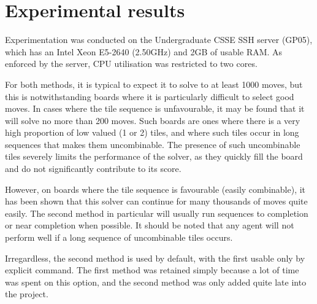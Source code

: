 \documentclass[a4paper, 11pt, titlepage]{report}
\begin{document}
\section{Experimental results}
Experimentation was conducted on the Undergraduate CSSE SSH server (GP05), which has an Intel Xeon E5-2640 (2.50GHz) and 2GB of usable RAM. As enforced by the server, CPU utilisation was restricted to two cores.

For both methods, it is typical to expect it to solve to at least 1000 moves, but this is notwithstanding boards where it is particularly difficult to select good moves. In cases where the tile sequence is unfavourable, it may be found that it will solve no more than 200 moves. Such boards are ones where there is a very high proportion of low valued (1 or 2) tiles, and where such tiles occur in long sequences that makes them uncombinable. The presence of such uncombinable tiles severely limits the performance of the solver, as they quickly fill the board and do not significantly contribute to its score.

However, on boards where the tile sequence is favourable (easily combinable), it has been shown that this solver can continue for many thousands of moves quite easily. The second method in particular will usually run sequences to completion or near completion when possible. It should be noted that any agent will not perform well if a long sequence of uncombinable tiles occurs. 

Irregardless, the second method is used by default, with the first usable only by explicit command. The first method was retained simply because a lot of time was spent on this option, and the second method was only added quite late into the project.
\end{document}

